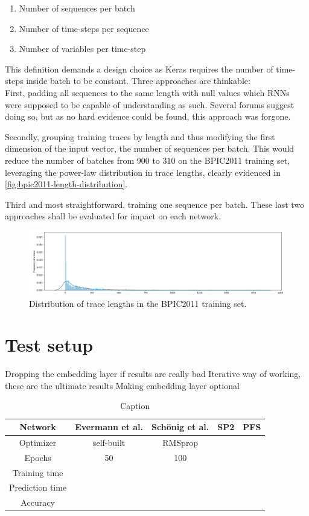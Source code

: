 \begin{enumerate}
    \item Number of sequences per batch
    \item Number of time-steps per sequence
    \item Number of variables per time-step
\end{enumerate}

This definition demands a design choice as Keras requires the number of time-steps inside batch to be constant. Three approaches are thinkable:\\

First, padding all sequences to the same length with null values which RNNs were supposed to be capable of understanding as such. Several forums suggest doing so, but as no hard evidence could be found, this approach was forgone.

Secondly, grouping training traces by length and thus modifying the first dimension of the input vector, the number of sequences per batch. This would reduce the number of batches from 900 to 310 on the BPIC2011 training set, leveraging the power-law distribution in trace lengths, clearly evidenced in \autoref{fig:bpic2011-length-distribution}.

Third and most straightforward, training one sequence per batch. These last two approaches shall be evaluated for impact on each network.

\begin{figure}
    \centering
    \includegraphics[width=\textwidth]{gfx/frequency-distribution.png}
    \caption{Distribution of trace lengths in the BPIC2011 training set.}
    \label{fig:bpic2011-length-distribution}
\end{figure}

\section{Test setup}
Dropping the embedding layer if results are really bad
Iterative way of working, these are the ultimate results
Making embedding layer optional

\begin{table}[]
    \centering
    \begin{tabular}{c|cccc}
        Network & Evermann et al. & Schönig et al. & SP2 & PFS\\
        \hline
        Optimizer & self-built & RMSprop  & \\
        Epochs  & 50    & 100 & \\
        Training time\\
        Prediction time\\
        Accuracy\\
    \end{tabular}
    \caption{Caption}
    \label{tab:my_label}
\end{table}

